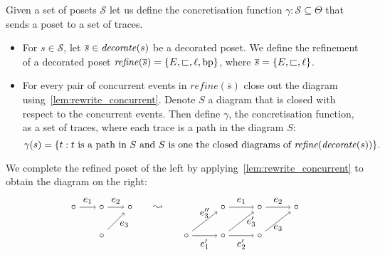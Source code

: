 \begin{definition}
  \label{def:concretisation}
  Given a set of posets $\mathcal{S}$ let us define the concretisation function $\gamma:\mathcal{S}\subseteq\Theta$ that sends a poset to a set of traces.
  \begin{itemize}
  \item For $s\in\mathcal{S}$, let $\overline{s}\in\mathit{decorate}(s)$ be a decorated poset.
    We define the refinement of a decorated poset $\mathit{refine}(\overline{s}) = \{E,\sqsubset,\ell,\operatorname{bp}\}$, where $\overline{s} = \{E,\sqsubset,\ell\}$.
  \item For every pair of concurrent events in $\mathit{refine}(\overline{s})$ close out the diagram using~\autoref{lem:rewrite_concurrent}. Denote $S$ a diagram that is closed with respect to the concurrent events. Then define $\gamma$, the concretisation function, as a set of traces, where each trace is a path in the diagram $S$:
    \[
    \gamma(s) = \{ t : t\text{ is a path in }S\text{ and }S\text{ is one the closed diagrams of }\mathit{refine}(\mathit{decorate}(s))\}.
    \]
  \end{itemize}
\end{definition}

\begin{example}
  We complete the refined poset of the left by applying~\autoref{lem:rewrite_concurrent} to obtain the diagram on the right:
  \[
  \begin{tikzpicture} %
  \node (n2) at (-1,1) {\(\circ\)};
  \node (m2) at (0,0) {\(\circ\)};
  \node (m1) at (0,1) {\(\circ\)};
  \node (n) at (1,1) {\(\circ\)};
  \node (implies) at (2,1) {\(\leadsto\)};
  \node (mm2) at (5.6,0) {\(\circ\)};
  \node (mm1) at (5.6,1) {\(\circ\)};
  \node (nn) at (6.9,1) {\(\circ\)};
  \node (mm) at (4.3,0) {\(\circ\)};
  \node (nn1) at (3,0) {\(\circ\)};
  \node (nn2) at (4.3,1) {\(\circ\)};
  \node (text) at (0.8,0.4) {\(e_3\)};
  \node (text1) at (5.3,0.5) {\(e_3'\)};
  \draw [->] (n2) -- node [left,above] {\(e_1\)} (m1);
  \draw [->] (m1) -- node [left,above] {\(e_2\)} (n);
  \draw [->] (m2) -- (n);
  \draw [->] (nn2) -- node [left,above] {\(e_1\)} (mm1);
  \draw [->] (mm1) -- node [left,above] {\(e_2\)} (nn);
  \draw [->] (mm2) -- node [left,below] {\(e_3\)} (nn);
  \draw [->] (mm) -- node [left,below] {\(e_2'\)} (mm2);
  \draw [->] (mm) -- (mm1);
  \draw [->] (nn1) -- node [above] {\(e_3''\)} (nn2);
  \draw [->] (nn1) -- node [left,below] {\(e_1'\)} (mm);
\end{tikzpicture}
\]
\end{example}

